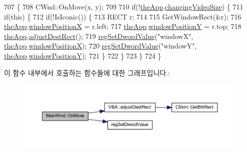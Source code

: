 \begin{DoxyCode}
707 \{
708   CWnd::OnMove(x, y);
709   
710   \textcolor{keywordflow}{if}(!\mbox{\hyperlink{_v_b_a_8cpp_a8095a9d06b37a7efe3723f3218ad8fb3}{theApp}}.\mbox{\hyperlink{class_v_b_a_ace8fe4b9a73291e292f0d4879cf2c852}{changingVideoSize}}) \{
711     \textcolor{keywordflow}{if}(\textcolor{keyword}{this}) \{
712       \textcolor{keywordflow}{if}(!IsIconic()) \{
713         RECT r;
714             
715         GetWindowRect(&r);
716         \mbox{\hyperlink{_v_b_a_8cpp_a8095a9d06b37a7efe3723f3218ad8fb3}{theApp}}.\mbox{\hyperlink{class_v_b_a_a5f9fb2744603deedbe9f8a77a7a2cf91}{windowPositionX}} = r.left;
717         \mbox{\hyperlink{_v_b_a_8cpp_a8095a9d06b37a7efe3723f3218ad8fb3}{theApp}}.\mbox{\hyperlink{class_v_b_a_a79b40ebb7ccfd4390eb0747168d07cad}{windowPositionY}} = r.top;
718         \mbox{\hyperlink{_v_b_a_8cpp_a8095a9d06b37a7efe3723f3218ad8fb3}{theApp}}.\mbox{\hyperlink{class_v_b_a_acb822065cba8b15810c5a61fd05ca831}{adjustDestRect}}();
719         \mbox{\hyperlink{_reg_8cpp_a758e775489a3fb5c3cc7071fdd5af87e}{regSetDwordValue}}(\textcolor{stringliteral}{"windowX"}, \mbox{\hyperlink{_v_b_a_8cpp_a8095a9d06b37a7efe3723f3218ad8fb3}{theApp}}.\mbox{\hyperlink{class_v_b_a_a5f9fb2744603deedbe9f8a77a7a2cf91}{windowPositionX}});
720         \mbox{\hyperlink{_reg_8cpp_a758e775489a3fb5c3cc7071fdd5af87e}{regSetDwordValue}}(\textcolor{stringliteral}{"windowY"}, \mbox{\hyperlink{_v_b_a_8cpp_a8095a9d06b37a7efe3723f3218ad8fb3}{theApp}}.\mbox{\hyperlink{class_v_b_a_a79b40ebb7ccfd4390eb0747168d07cad}{windowPositionY}});
721       \}
722     \}
723   \}
724 \}
\end{DoxyCode}
이 함수 내부에서 호출하는 함수들에 대한 그래프입니다.\+:
\nopagebreak
\begin{figure}[H]
\begin{center}
\leavevmode
\includegraphics[width=350pt]{class_main_wnd_ab6523035512af1482f5a9656ea556661_cgraph}
\end{center}
\end{figure}
\mbox{\label{class_main_wnd_a314268b72fbd07b1e4fe0b96dada585e}} 
